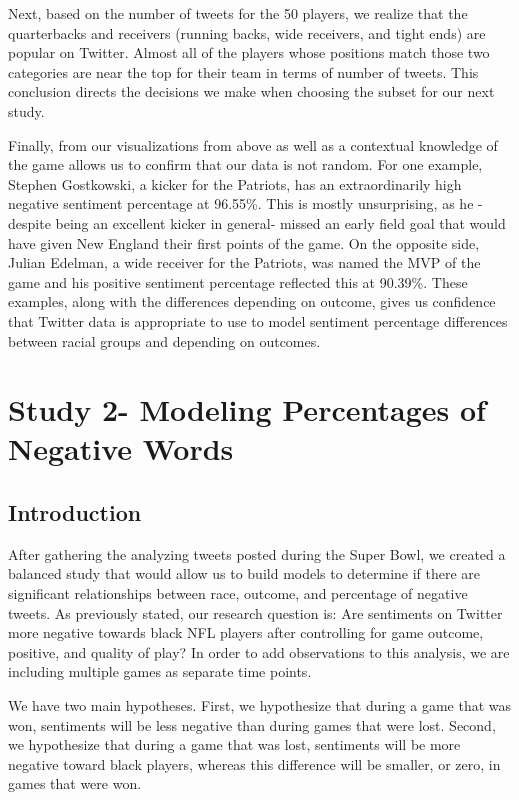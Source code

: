 \documentclass[12pt,twoside]{reedthesis}
\begin{document}
Next, based on the number of tweets for the 50 players, we realize that
the quarterbacks and receivers (running backs, wide receivers, and tight
ends) are popular on Twitter. Almost all of the players whose positions
match those two categories are near the top for their team in terms of
number of tweets. This conclusion directs the decisions we make when
choosing the subset for our next study.

Finally, from our visualizations from above as well as a contextual
knowledge of the game allows us to confirm that our data is not random.
For one example, Stephen Gostkowski, a kicker for the Patriots, has an
extraordinarily high negative sentiment percentage at 96.55\%. This is
mostly unsurprising, as he -despite being an excellent kicker in
general- missed an early field goal that would have given New England
their first points of the game. On the opposite side, Julian Edelman, a
wide receiver for the Patriots, was named the MVP of the game and his
positive sentiment percentage reflected this at 90.39\%. These examples,
along with the differences depending on outcome, gives us confidence
that Twitter data is appropriate to use to model sentiment percentage
differences between racial groups and depending on outcomes.

\chapter{Study 2- Modeling Percentages of Negative
Words}\label{study-2--modeling-percentages-of-negative-words}

\section{Introduction}\label{introduction-1}

After gathering the analyzing tweets posted during the Super Bowl, we
created a balanced study that would allow us to build models to
determine if there are significant relationships between race, outcome,
and percentage of negative tweets. As previously stated, our research
question is: Are sentiments on Twitter more negative towards black NFL
players after controlling for game outcome, positive, and quality of
play? In order to add observations to this analysis, we are including
multiple games as separate time points.

We have two main hypotheses. First, we hypothesize that during a game
that was won, sentiments will be less negative than during games that
were lost. Second, we hypothesize that during a game that was lost,
sentiments will be more negative toward black players, whereas this
difference will be smaller, or zero, in games that were won.
\end{document}
